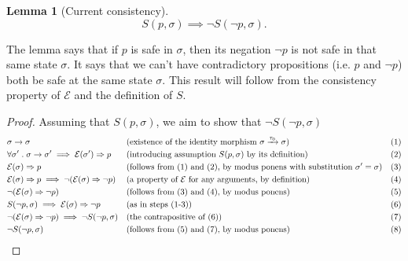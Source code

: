 \documentclass{article}
\theoremstyle{definition}
\newtheorem{lemma}{Lemma}
\begin{document}
\vspace{5mm}

\begin{lemma}[Current consistency]
$$
S(p,\sigma) \implies \neg{S(\neg{p},\sigma)}.
$$
\end{lemma}

The lemma says that if $p$ is safe in $\sigma$, then its negation $\neg{p}$ is not safe in that same state $\sigma$. It says that we can't have contradictory propositions (i.e. $p$ and $\neg{p}$) both be safe at the same state $\sigma$. This result will follow from the consistency property of $\mathcal{E}$ and the definition of $S$.

\begin{proof}
  Assuming that $S(p,\sigma)$, we aim to show that $\neg{S(\neg{p},\sigma)}$
  \begin{align*}
    &\sigma \to \sigma &&\text{(existence of the identity morphism  $\sigma \xrightarrow[]{\tau_0} \sigma$)} &&\text{(1)} \\
    &\forall \sigma' \hspace{1mm}.\hspace{1mm}\sigma \to \sigma' \implies \mathcal{E}(\sigma') \Rightarrow p &&\text{(introducing assumption $S(p, \sigma)$ by its definition) }   &&\text{(2)} \\
    &\mathcal{E}(\sigma) \Rightarrow p &&\text{(follows from (1) and (2), by modus ponens with substitution $\sigma' = \sigma$)} &&\text{(3)}\\
    &\mathcal{E}(\sigma) \Rightarrow p \implies \neg{(\mathcal{E}(\sigma) \Rightarrow \neg{p})} &&\text{(a property of $\mathcal{E}$ for any arguments, by definition)}  &&\text{(4)} \\
    &\neg{(\mathcal{E}(\sigma) \Rightarrow \neg{p})} &&\text{(follows from (3) and (4), by modus ponens)} &&\text{(5)}\\
    &S(\neg{p},\sigma) \implies \mathcal{E}(\sigma) \Rightarrow \neg{p} &&\text{(as in steps (1-3))}   &&\text{(6)} \\
    &\neg{(\mathcal{E}(\sigma) \Rightarrow \neg{p})} \implies \neg{S(\neg{p},\sigma)} &&\text{(the contrapositive of (6))}  &&\text{(7)} \\
    &\neg{S(\neg{p},\sigma)}  \hspace{5mm} \qedhere&&\text{(follows from (5) and (7), by modus ponens)}   &&\text{(8)}
  \end{align*}
\end{proof}

\vspace{5mm}
\end{document}
